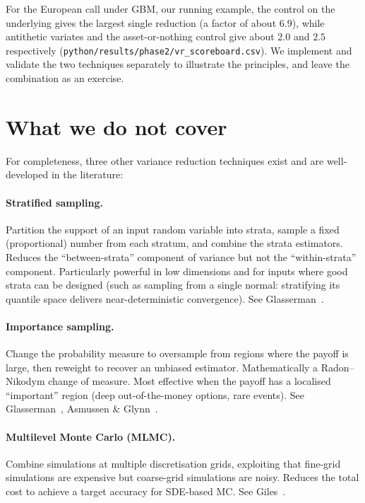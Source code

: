 \documentclass[11pt,a4paper]{article}
\theoremstyle{plain}
\theoremstyle{definition}
\theoremstyle{remark}
\begin{document}
For the European call under GBM, our running example, the control on
the underlying gives the largest single reduction (a factor of about
$6.9$), while antithetic variates and the asset-or-nothing control
give about $2.0$ and $2.5$ respectively
(\texttt{python/results/phase2/vr\_scoreboard.csv}). We implement and
validate the two techniques separately to illustrate the principles,
and leave the combination as an exercise.

\section{What we do not cover}
\label{sec:not-covered}

For completeness, three other variance reduction techniques exist
and are well-developed in the literature:

\paragraph{Stratified sampling.} Partition the support of an input
random variable into strata, sample a fixed (proportional) number
from each stratum, and combine the strata estimators. Reduces the
``between-strata'' component of variance but not the ``within-strata''
component. Particularly powerful in low dimensions and for inputs
where good strata can be designed (such as sampling from a single
normal: stratifying its quantile space delivers near-deterministic
convergence). See Glasserman~\cite[Chapter~4]{Glasserman}.

\paragraph{Importance sampling.} Change the probability measure to
oversample from regions where the payoff is large, then reweight to
recover an unbiased estimator. Mathematically a Radon--Nikodym
change of measure. Most effective when the payoff has a localised
``important'' region (deep out-of-the-money options, rare events).
See Glasserman~\cite[Chapter~4]{Glasserman}, Asmussen \&
Glynn~\cite{AsmussenGlynn}.

\paragraph{Multilevel Monte Carlo (MLMC).} Combine simulations at
multiple discretisation grids, exploiting that fine-grid simulations
are expensive but coarse-grid simulations are noisy. Reduces the
total cost to achieve a target accuracy for SDE-based MC. See
Giles~\cite{Giles2008}.
\end{document}
